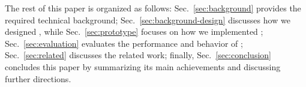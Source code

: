 
The rest of this paper is organized as follows: Sec.~\ref{sec:background}
provides the required technical background; Sec.~\ref{sec:background-design}
discusses how we designed \tcpls, while Sec.~\ref{sec:prototype} focuses on how
we implemented \tcpls; Sec.~\ref{sec:evaluation} evaluates the performance and
behavior of \tcpls; Sec.~\ref{sec:related} discusses the related work;  finally, Sec.~\ref{sec:conclusion} concludes this paper by
summarizing its main achievements and discussing further directions.
